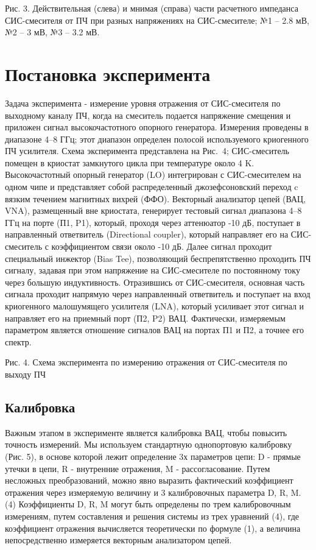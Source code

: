 \documentclass[a4paper]{article}
\begin{document}
Рис. 3. Действительная (слева) и мнимая (справа) части расчетного импеданса СИС-смесителя от ПЧ при разных напряжениях на СИС-смесителе; №1 – 2.8 мВ, №2 – 3 мВ, №3 – 3.2 мВ.

\section{Постановка эксперимента}
 Задача эксперимента - измерение уровня отражения от СИС-смесителя по выходному каналу ПЧ, когда на смеситель подается напряжение смещения и приложен сигнал высокочастотного опорного генератора. Измерения проведены в диапазоне 4–8 ГГц; этот диапазон определен полосой используемого криогенного ПЧ усилителя. Схема эксперимента представлена на Рис. 4; СИС-смеситель помещен в криостат замкнутого цикла при температуре около 4 K. Высокочастотный опорный генератор (LO) интегрирован с СИС-смесителем на одном чипе и представляет собой распределенный джозефсоновский переход c вязким течением магнитных вихрей (ФФО).  Векторный анализатор цепей (ВАЦ, VNA), размещенный вне криостата, генерирует тестовый сигнал диапазона 4–8 ГГц на порте (П1, P1), который, проходя через аттенюатор -10 дБ, поступает в направленный ответвитель (Directional coupler), который направляет его на СИС-смеситель с коэффициентом связи около -10 дБ. Далее сигнал проходит специальный инжектор (Bias Tee), позволяющий беспрепятственно проходить ПЧ сигналу, задавая при этом напряжение на СИС-смесителе по постоянному току через большую индуктивность. Отразившись от СИС-смесителя, основная часть сигнала проходит напрямую через направленный ответвитель и поступает на вход криогенного малошумящего усилителя (LNA), который усиливает этот сигнал и направляет его на приемный порт (П2, P2) ВАЦ. Фактически, измеряемым параметром является отношение сигналов ВАЦ на портах П1 и П2, а точнее его спектр.

Рис. 4. Схема эксперимента по измерению отражения от СИС-смесителя по выходу ПЧ

\subsection{Калибровка}
Важным этапом в эксперименте является калибровка ВАЦ, чтобы повысить точность измерений. Мы используем стандартную однопортовую калибровку (Рис. 5), в основе которой лежит определение 3х параметров цепи: D - прямые утечки в цепи, R - внутренние отражения, M - рассогласование. Путем несложных преобразований, можно явно выразить фактический коэффициент отражения   через измеряемую величину  и 3 калибровочных параметра D, R, M.
	(4)
Коэффициенты D, R, M могут быть определены по трем калибровочным измерениям, путем составления и решения системы из трех уравнений (4), где коэффициент отражения  вычисляется теоретически по формуле (1), а величина  непосредственно измеряется векторным анализатором цепей.
\end{document}
